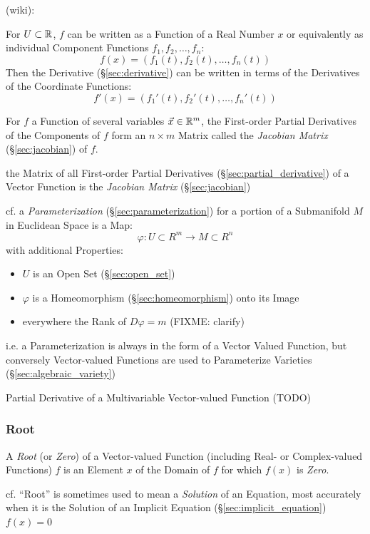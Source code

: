 {(wiki):

For $U \subset \mathbb{R}$, $f$ can be written as a Function of a Real Number $x$ or
equivalently as individual Component Functions $f_1, f_2, \ldots, f_n$:
\[
  f(x) = (f_1(t), f_2(t), \ldots, f_n(t))
\]
Then the Derivative (\S\ref{sec:derivative}) can be written in terms of the
Derivatives of the Coordinate Functions:
\[
  f'(x) = (f_1'(t), f_2'(t), \ldots, f_n'(t))
\]

For $f$ a Function of several variables $\vec{x} \in \mathbb{R}^m$, the First-order
Partial Derivatives of the Components of $f$ form an $n \times m$ Matrix called
the \emph{Jacobian Matrix} (\S\ref{sec:jacobian}) of $f$.

the Matrix of all First-order Partial Derivatives
(\S\ref{sec:partial_derivative}) of a Vector Function is the \emph{Jacobian
  Matrix} (\S\ref{sec:jacobian})

\fist cf. a \emph{Parameterization} (\S\ref{sec:parameterization}) for a
portion of a Submanifold $M$ in Euclidean Space is a Map:
\[
  \varphi : U \subset R^m \rightarrow M \subset R^n
\]
with additional Properties:
\begin{itemize}
  \item $U$ is an Open Set (\S\ref{sec:open_set})
  \item $\varphi$ is a Homeomorphism (\S\ref{sec:homeomorphism}) onto its Image
  \item everywhere the Rank of $D\varphi = m$ (FIXME: clarify)
\end{itemize}
i.e. a Parameterization is always in the form of a Vector Valued Function, but
conversely Vector-valued Functions are used to Parameterize Varieties
(\S\ref{sec:algebraic_variety}) %

Partial Derivative of a Multivariable Vector-valued Function (TODO)



\subsubsection{Root}\label{sec:root}

A \emph{Root} (or \emph{Zero}) of a Vector-valued Function (including Real- or
Complex-valued Functions) $f$ is an Element $x$ of the Domain of $f$ for which
$f(x)$ is \emph{Zero}.

\fist cf. ``Root'' is sometimes used to mean a \emph{Solution} of an Equation,
most accurately when it is the Solution of an Implicit Equation
(\S\ref{sec:implicit_equation}) $f(x) = 0$

}
